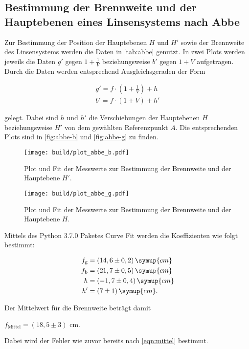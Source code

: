 \subsection{Bestimmung der Brennweite und der Hauptebenen eines Linsensystems nach Abbe}



Zur Bestimmung der Position der Hauptebenen $H$ und $H'$ sowie der Brennweite des Linsensystems werden die Daten in \autoref{tab:abbe} genutzt.
In zwei Plots werden jeweils die Daten $g'$ gegen $1 + \frac{1}{V}$ beziehungsweise $b'$ gegen $1 + V$ aufgetragen.
Durch die Daten werden entsprechend Ausgleichsgeraden der Form

\begin{align}
  g' = f \cdot (1 + \frac{1}{V}) + h\\
  b' = f \cdot (1 + V) + h'
\end{align}

gelegt. Dabei sind $h$ und $h'$ die Verschiebungen der Hauptebenen $H$ beziehungsweise $H'$ von dem gewählten Referenzpunkt $A$.
Die entsprechenden Plots sind in \autoref{fig:abbe-b} und \autoref{fig:abbe-g} zu finden.

\begin{figure}
  \centering
  \texttt{[image: build/plot\_abbe\_b.pdf]}
  \caption{Plot und Fit der Messwerte zur Bestimmung der Brennweite und der Hauptebene $H'$.}
  \label{fig:abbe-b}
\end{figure}

\begin{figure}
  \centering
  \texttt{[image: build/plot\_abbe\_g.pdf]}
  \caption{Plot und Fit der Messwerte zur Bestimmung der Brennweite und der Hauptebene $H$.}
  \label{fig:abbe-g}
\end{figure}

Mittels des Python 3.7.0 Paketes Curve Fit werden die Koeffizienten wie folgt bestimmt:

\begin{align*}
  f_\text{g} &= (14,6 \pm 0,2) \, \symup{cm}\\
  f_\text{b} &= (21,7 \pm 0,5) \, \symup{cm}\\
  h  &= (-1,7 \pm 0,4) \, \symup{cm}\\
  h' &= (7 \pm 1) \, \symup{cm}.
\end{align*}

Der Mittelwert für die Brennweite beträgt damit

\begin{center}
  $f_\text{Mittel} = (18,5 \pm 3)$ cm.
\end{center}

Dabei wird der Fehler wie zuvor bereits nach \eqref{eqn:mittel} bestimmt.